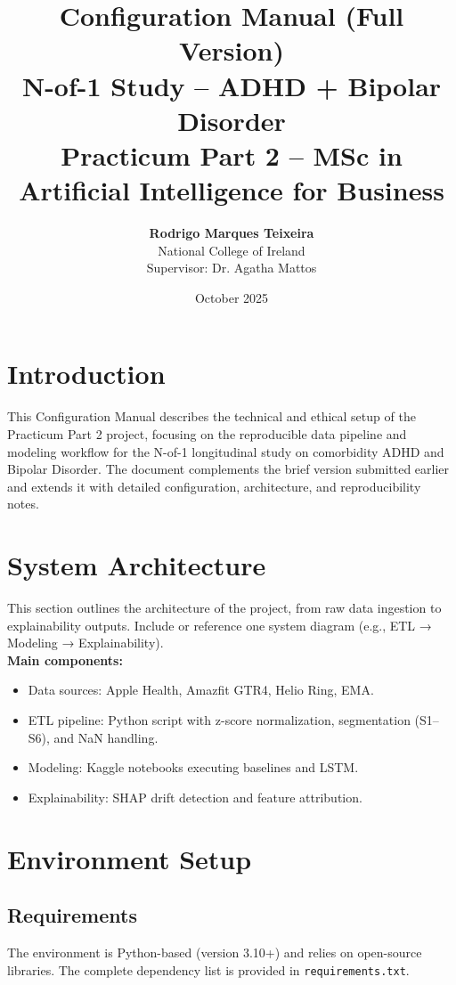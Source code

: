 \documentclass[12pt,a4paper]{article}
\title{\textbf{Configuration Manual (Full Version)}\\N-of-1 Study – ADHD + Bipolar Disorder\\\vspace{0.4cm}\large Practicum Part 2 – MSc in Artificial Intelligence for Business}
\author{\textbf{Rodrigo Marques Teixeira} \\ National College of Ireland \\ Supervisor: Dr. Agatha Mattos}
\date{October 2025}
\begin{document}
\maketitle
\tableofcontents
\newpage

\section{Introduction}
This Configuration Manual describes the technical and ethical setup of the Practicum Part 2 project, focusing on the reproducible data pipeline and modeling workflow for the N-of-1 longitudinal study on comorbidity ADHD and Bipolar Disorder. The document complements the brief version submitted earlier and extends it with detailed configuration, architecture, and reproducibility notes.

\section{System Architecture}
This section outlines the architecture of the project, from raw data ingestion to explainability outputs. Include or reference one system diagram (e.g., ETL → Modeling → Explainability).\\
\textbf{Main components:}
\begin{itemize}
    \item Data sources: Apple Health, Amazfit GTR4, Helio Ring, EMA.
    \item ETL pipeline: Python script with z-score normalization, segmentation (S1–S6), and NaN handling.
    \item Modeling: Kaggle notebooks executing baselines and LSTM.
    \item Explainability: SHAP drift detection and feature attribution.
\end{itemize}

\section{Environment Setup}
\subsection{Requirements}
The environment is Python-based (version 3.10+) and relies on open-source libraries. The complete dependency list is provided in \texttt{requirements.txt}.
\end{document}

